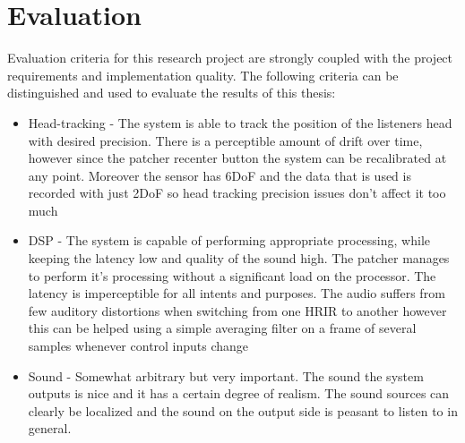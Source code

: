 \documentclass[a4paper,12pt,oneside]{article}
\begin{document}
\section{Evaluation}

Evaluation criteria for this research project are strongly coupled with the project requirements and implementation quality. The following criteria can be distinguished and used to evaluate the results of this thesis:
\begin{itemize}
\item Head-tracking - The system is able to track the position of the listeners head with desired precision. There is a perceptible amount of drift over time, however since the patcher recenter button the system can be recalibrated at any point. Moreover the sensor has 6DoF and the data that is used is recorded with just 2DoF so head tracking precision issues don't affect it too much
\item DSP - The system is capable of performing appropriate processing, while keeping the latency low and quality of the sound high. The patcher manages to perform it's processing without a significant load on the processor. The latency is imperceptible for all intents and purposes. The audio suffers from few auditory distortions when switching from one HRIR to another however this can be helped using a simple averaging filter on a frame of several samples whenever control inputs change
\item Sound - Somewhat arbitrary but very important. The sound the system outputs is nice and it has a certain degree of realism. The sound sources can clearly be localized and the sound on the output side is peasant to listen to in general.
\end{itemize}
  
  \newpage
  
  
  
  
  
\end{document}
